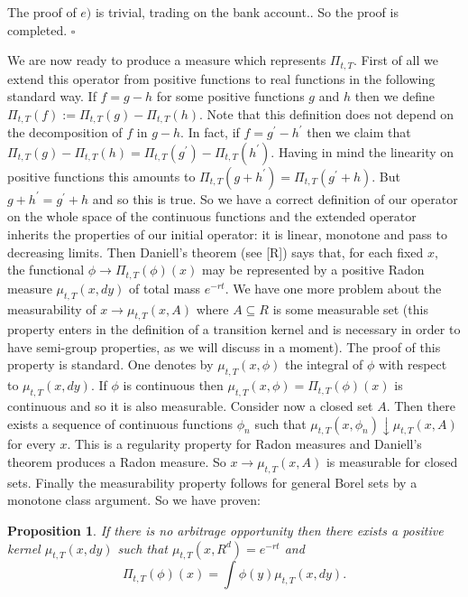 \documentclass[a4paper]{article}
\newtheorem{proposition}{Proposition}[section]
\begin{document}
The proof of $e)$ is trivial, trading on the bank account.. So the proof is
completed. $\square $

We are now ready to produce a measure which represents $\Pi _{t,T}.$ First
of all we extend this operator from positive functions to real functions in
the following standard way. If $f=g-h$ for some positive functions $g$ and $%
h $ then we define $\Pi _{t,T}(f):=\Pi _{t,T}(g)-\Pi _{t,T}(h).$ Note that
this definition does not depend on the decomposition of $f$ in $g-h.$ In
fact, if $f=g^{\prime }-h^{\prime }$ then we claim that $\Pi _{t,T}(g)-\Pi
_{t,T}(h)=\Pi _{t,T}(g^{\prime })-\Pi _{t,T}(h^{\prime }).$ Having in mind
the linearity on positive functions this amounts to $\Pi _{t,T}(g+h^{\prime
})=\Pi _{t,T}(g^{\prime }+h).$ But $g+h^{\prime }=g^{\prime }+h$ and so this
is true. So we have a correct definition of our operator on the whole space
of the continuous functions and the extended operator inherits the
properties of our initial operator: it is linear, monotone and pass to
decreasing limits. Then Daniell's theorem (see [R]) says that, for each
fixed $x,$ the functional $\phi \rightarrow \Pi _{t,T}(\phi )(x)$ may be
represented by a positive Radon measure $\mu _{t,T}(x,dy)$ of total mass $%
e^{-rt}.$ We have one more problem about the measurability of $x\rightarrow
\mu _{t,T}(x,A)$ where $A\subseteq R$ is some measurable set (this property
enters in the definition of a transition kernel and is necessary in order to
have semi-group properties, as we will discuss in a moment). The proof of
this property is standard. One denotes by $\mu _{t,T}(x,\phi )$ the integral
of $\phi $ with respect to $\mu _{t,T}(x,dy).$ If $\phi $ is continuous then
$\mu _{t,T}(x,\phi )=\Pi _{t,T}(\phi )(x)$ is continuous and so it is also
measurable. Consider now a closed set $A.$ Then there exists a sequence of
continuous functions $\phi _{n}$ such that $\mu _{t,T}(x,\phi
_{n})\downarrow \mu _{t,T}(x,A)$ for every $x.$ This is a regularity
property for Radon measures and Daniell's theorem produces a Radon measure.
So $x\rightarrow \mu _{t,T}(x,A)$ is measurable for closed sets. Finally the
measurability property follows for general Borel sets by a monotone class
argument. So we have proven:

\begin{proposition}
If there is no arbitrage opportunity then there exists a positive
kernel $\mu _{t,T} (x,dy)$ such that $\mu
_{t,T}(x,R^{d})=e^{-rt}$ and
\[
\Pi _{t,T}(\phi )(x)=\int \phi (y)\mu _{t,T}(x,dy).
\]
\end{proposition}
\end{document}
